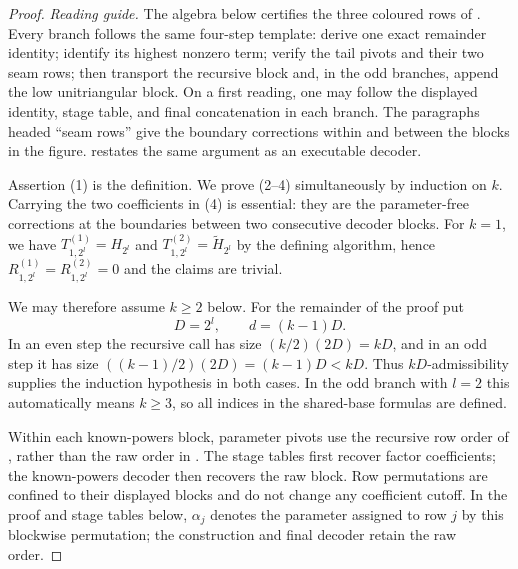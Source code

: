 \begin{proof}
    \emph{Reading guide.}
    The algebra below certifies the three coloured rows of
    .  Every branch follows the same four-step template:
    derive one exact remainder identity; identify its highest nonzero term;
    verify the tail pivots and their two seam rows; then transport the recursive
    block and, in the odd branches, append the low unitriangular block.
    On a first reading, one may
    follow the displayed identity, stage table, and final concatenation in each
    branch.  The paragraphs headed ``seam rows'' give the boundary
    corrections within and between the blocks in the figure.
     restates the same
    argument as an executable decoder.

    Assertion (1) is the definition.  We prove (2--4) simultaneously by
    induction on $k$.  Carrying the two coefficients in (4) is essential:
    they are the parameter-free corrections at the boundaries between two
    consecutive decoder blocks.
    For $k=1$, we have $T^{(1)}_{1,2^l}=H_{2^l}$ and $T^{(2)}_{1,2^l}=\tilde H_{2^l}$ by the defining algorithm, hence $R^{(1)}_{1,2^l}=R^{(2)}_{1,2^l}=0$ and the claims are trivial.

    We may therefore assume $k\ge2$ below.  For the remainder of the proof
    put
    \[
       D=2^l,\qquad d=(k-1)D.
    \]
    In an even step the recursive call has size
    $(k/2)(2D)=kD$, and in an odd step it has size
    $((k-1)/2)(2D)=(k-1)D<kD$.  Thus $kD$-admissibility supplies the
    induction hypothesis in both cases.
    In the odd branch with $l=2$ this automatically means $k\ge3$, so all
    indices in the shared-base formulas are defined.

      Within each known-powers block, parameter pivots use the recursive
      row order of , rather than the raw order in
      .  The stage tables first recover factor
      coefficients; the known-powers decoder then recovers the raw block.
      Row permutations are confined to their displayed blocks and do not
      change any coefficient cutoff.  In the proof and stage tables below,
      $\alpha_j$ denotes the parameter assigned to row $j$ by this blockwise
      permutation; the construction and final decoder retain the raw order.


\end{proof}
